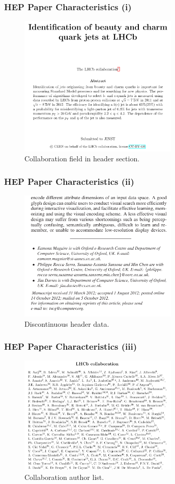 \documentclass{beamer}
\begin{document}
\begin{frame}
\frametitle{HEP Paper Characteristics (i)}
\begin{figure}[h]
\center
\includegraphics[width=3in]{Figures/collaboration.pdf}
\caption{Collaboration field in header section.}
\end{figure}
\end{frame}

\begin{frame}
\frametitle{HEP Paper Characteristics (ii)}
\begin{figure}[h]
\center
\includegraphics[width=3in]{Figures/eamonn.pdf}
\caption{Discontinuous header data.}
\end{figure}
\end{frame}

\begin{frame}
\frametitle{HEP Paper Characteristics (iii)}
\begin{figure}[h]
\center
\includegraphics[width=3in]{Figures/authors.pdf}
\caption{Collaboration author list.}
\end{figure}
\end{frame}
\end{document}
